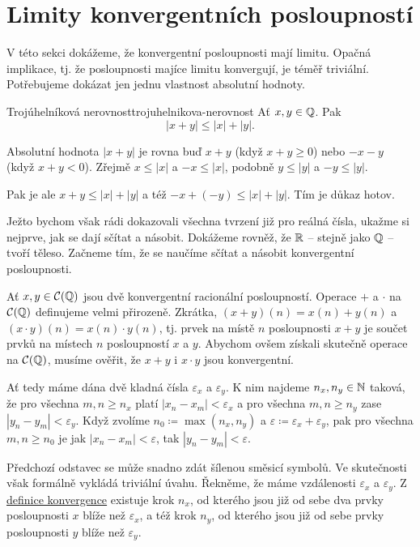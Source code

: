\section{Limity konvergentních posloupností}
\label{sec:limity-konvergentnich-posloupnosti}

V této sekci dokážeme, že konvergentní posloupnosti mají limitu. Opačná
implikace, tj. že posloupnosti majíce limitu konvergují, je téměř triviální.
Potřebujeme dokázat jen jednu vlastnost absolutní hodnoty.

\begin{lemma}{Trojúhelníková nerovnost}{trojuhelnikova-nerovnost}
 Ať $x,y \in \mathbb{Q}$. Pak
 \[
  |x + y| \leq |x| + |y|.
 \]
\end{lemma}
\begin{lemproof}
 Absolutní hodnota $|x+y|$ je rovna buď $x + y$ (když $x+y \geq 0$) nebo $-x-y$
 (když $x+y<0$). Zřejmě $x \leq |x|$ a $-x \leq |x|$, podobně $y \leq |y|$ a
 $-y \leq |y|$.

 Pak je ale $x + y \leq |x| + |y|$ a též $-x+(-y) \leq |x| + |y|$. Tím je důkaz
 hotov.
\end{lemproof}

Ježto bychom však rádi dokazovali všechna tvrzení již pro reálná čísla, ukažme
si nejprve, jak se dají sčítat a násobit. Dokážeme rovněž, že $\mathbb{R}$ -- stejně
jako $\mathbb{Q}$ -- tvoří těleso. Začneme tím, že se naučíme sčítat a násobit
konvergentní posloupnosti.

Ať $x,y \in \mathcal{C}(\mathbb{Q})$ jsou dvě konvergentní racionální posloupností.
Operace $+$ a $ \cdot $ na $\mathcal{C}(\mathbb{Q})$ definujeme velmi přirozeně.
Zkrátka, $(x+y)(n) = x(n) + y(n)$ a $(x \cdot y)(n) = x(n) \cdot y(n)$, tj.
prvek na místě $n$ posloupnosti $x+y$ je součet prvků na místech $n$
posloupností $x$ a $y$. Abychom ovšem získali skutečně operace na
$\mathcal{C}(\mathbb{Q})$, musíme ověřit, že $x+y$ i $x \cdot y$ jsou konvergentní.

Ať tedy máme dána dvě kladná čísla $\varepsilon_x$ a $\varepsilon_y$. K nim
najdeme $n_x,n_y \in \mathbb{N}$ taková, že pro všechna $m,n \geq n_x$ platí $|x_n -
x_m|<\varepsilon_x$ a pro všechna $m,n \geq n_y$ zase $|y_n - y_m| <
\varepsilon_y$. Když zvolíme $n_0 \coloneqq \max(n_x,n_y)$ a $\varepsilon
\coloneqq \varepsilon_x + \varepsilon_y$, pak pro všechna $m,n \geq n_0$ je jak
$|x_n - x_m|<\varepsilon$, tak $|y_n - y_m|<\varepsilon$.

Předchozí odstavec se může snadno zdát šílenou směsicí symbolů. Ve skutečnosti
však formálně vykládá triviální úvahu. Řekněme, že máme vzdálenosti
$\varepsilon_x$ a $\varepsilon_y$. Z
\hyperref[def:konvergentni-posloupnost]{definice konvergence} existuje krok
$n_x$, od kterého jsou již od sebe dva prvky posloupnosti $x$ blíže než
$\varepsilon_x$, a též krok $n_y$, od kterého jsou již od sebe prvky posloupnosti
$y$ blíže než $\varepsilon_y.$
